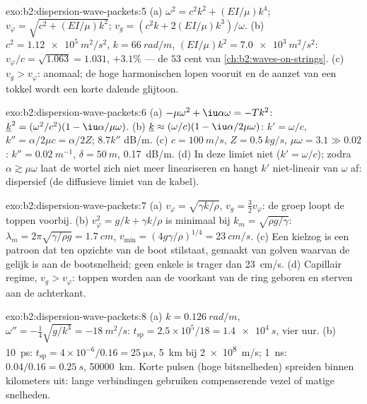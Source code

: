 \begin{solution}{exo:b2:dispersion-wave-packets:5}
(a) $\omega^2 = c^2k^2 + (EI/\mu)k^4$;
$v_\varphi = \sqrt{c^2 + (EI/\mu)k^2}$;
$v_g = (c^2k +
2(EI/\mu)k^3)/\omega$. (b) $c^2 = \qty{1.12e5}{m^2/s^2}$,
$k = \qty{66}{rad/m}$, $(EI/\mu)k^2
= \qty{7.0e3}{m^2/s^2}$:
$v_\varphi/c = \sqrt{1.063} = 1.031$, $+3.1\%$ --- de $53$ cent van
\cref{ch:b2:waves-on-strings}. (c) $v_g > v_\varphi$: anomaal; de hoge
harmonischen lopen vooruit en de aanzet van een tokkel wordt een korte
dalende glijtoon.
\end{solution}

\begin{solution}{exo:b2:dispersion-wave-packets:6}
(a) $-\mu\omega^2 + \iu\alpha\omega = -Tk^2$:
$\underline k^2 = (\omega^2/c^2)(1 - \iu\alpha/\mu\omega)$. (b)
$\underline k \approx (\omega/c)(1 - \iu\alpha/2\mu\omega)$:
$k' = \omega/c$, $k'' = \alpha/2\mu c =
\alpha/2Z$; $8.7k''$ dB/m. (c)
$c = \qty{100}{m/s}$, $Z = \qty{0.5}{kg/s}$, $\mu\omega = 3.1 \gg
0.02$:
$k'' = \qty{0.02}{m^{-1}}$, $\delta = \qty{50}{m}$, \qty{0.17}{dB/m}. (d) In
deze limiet niet ($k' = \omega/c$); zodra $\alpha \gtrsim \mu\omega$ laat de
wortel zich niet meer lineariseren en hangt $k'$ niet-lineair van $\omega$
af: dispersief (de diffusieve limiet van de kabel).
\end{solution}

\begin{solution}{exo:b2:dispersion-wave-packets:7}
(a) $v_\varphi = \sqrt{\gamma k/\rho}$, $v_g = \tfrac32v_\varphi$: de groep
loopt de toppen voorbij. (b) $v_\varphi^2 = g/k + \gamma k/\rho$ is minimaal
bij $k_m = \sqrt{\rho g/\gamma}$:
$\lambda_m = 2\pi\sqrt{\gamma/\rho g} = \qty{1.7}{cm}$,
$v_{\min} = (4g\gamma/\rho)^{1/4} =
\qty{23}{cm/s}$. (c) Een kielzog is een
patroon dat ten opzichte van de boot stilstaat, gemaakt van golven waarvan
de  gelijk is aan de bootsnelheid; geen enkele is trager dan
\qty{23}{cm/s}. (d) Capillair regime, $v_g > v_\varphi$: toppen worden aan
de voorkant van de ring geboren en sterven aan de achterkant.
\end{solution}

\begin{solution}{exo:b2:dispersion-wave-packets:8}
(a) $k = \qty{0.126}{rad/m}$,
$\omega'' = -\tfrac14\sqrt{g/k^3} = \qty{-18}{m^2/s}$:
$t_{\text{sp}}
= 2.5 \times 10^5/18 = \qty{1.4e4}{s}$, vier uur. (b)
\qty{10}{ps}: $t_{\text{sp}} =
4 \times 10^{-6}/0.16 = \qty{25}{\micro s}$,
\qty{5}{km} bij \qty{2e8}{m/s}; \qty{1}{ns}: $0.04/0.16 =
\qty{0.25}{s}$,
\qty{50000}{km}. Korte pulsen (hoge bitsnelheden) spreiden binnen kilometers
uit: lange verbindingen gebruiken compenserende vezel of matige snelheden.
\end{solution}

